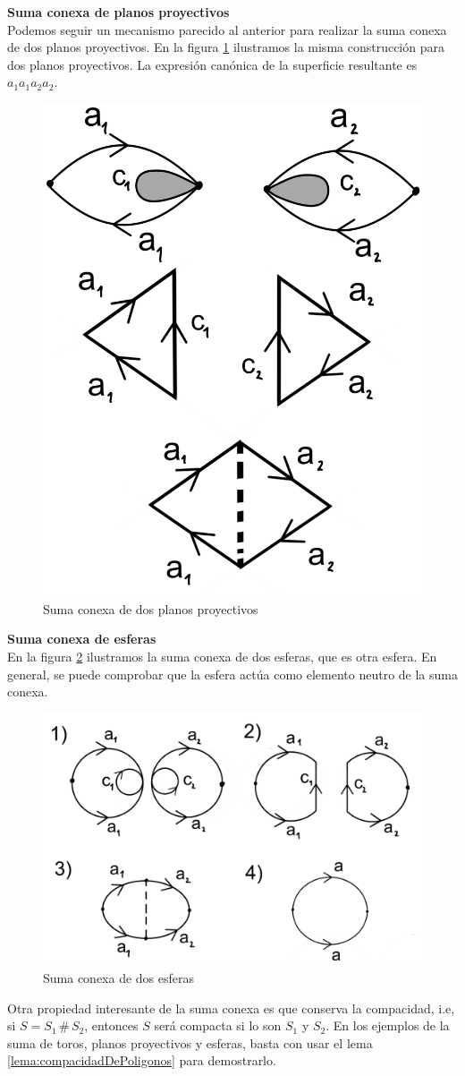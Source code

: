 \documentclass[a4paper,11pt,spanish, twoside, leqno]{tfg-uam}
\theoremstyle{definition}
\begin{document}
\noindent \textbf{Suma conexa de planos proyectivos}
\\
Podemos seguir un mecanismo parecido al anterior para realizar la suma conexa de dos planos proyectivos. En la figura \ref{fig:suma conexa de planos p} ilustramos la misma construcción para dos planos proyectivos. La expresión canónica de la superficie resultante es $ a_1a_1a_2a_2 $.

\begin{figure}[h!]
	\centering
	\includegraphics[width=0.3\linewidth]{imagenes/sumaconexa_planosp.png}
	\caption{Suma conexa de dos planos proyectivos}
	\label{fig:suma conexa de planos p}
\end{figure} 

\noindent \textbf{Suma conexa de esferas}
\\
En la figura \ref{fig:suma conexa de esferas} ilustramos la suma conexa de dos esferas, que es otra esfera. En general, se puede comprobar que la esfera actúa como elemento neutro de la suma conexa.

\begin{figure}[h!]
	\centering
	\includegraphics[width=0.5\linewidth]{imagenes/sumaconexa_esferas.png}
	\caption{Suma conexa de dos esferas}
	\label{fig:suma conexa de esferas}
\end{figure} 

Otra propiedad interesante de la suma conexa es que conserva la compacidad, i.e, si $S=S_1 \, \# \, S_2$, entonces $S$ será compacta si lo son $S_1$ y $S_2$. En los ejemplos de la suma de toros, planos proyectivos y esferas, basta con usar el lema \ref{lema:compacidadDePoligonos} para demostrarlo.
\end{document}
